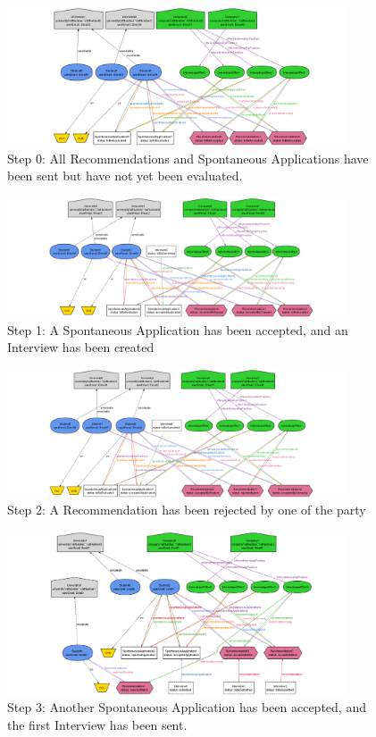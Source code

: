 \begin{figure}[h]
    \centering
    \includegraphics[width=0.9\textwidth]{Alloy/AlloyImage/0.png}
    \caption{Step 0: All Recommendations and Spontaneous Applications have been sent but have not yet been evaluated.}
    \label{fig:ALIMG0}
\end{figure}
\begin{figure}[h]
    \centering
    \includegraphics[width=0.9\textwidth]{Alloy/AlloyImage/1.png}
    \caption{Step 1: A Spontaneous Application has been accepted, and an Interview has been created}
    \label{fig:ALIMG1}
\end{figure}
\begin{figure}[h]
    \centering
    \includegraphics[width=0.9\textwidth]{Alloy/AlloyImage/2.png}
    \caption{Step 2: A Recommendation has been rejected by one of the party}
    \label{fig:ALIMG2}
\end{figure}
\begin{figure}[h]
    \centering
    \includegraphics[width=0.9\textwidth]{Alloy/AlloyImage/3.png}
    \caption{Step 3: Another Spontaneous Application has been accepted, and the first Interview has been sent. }
    \label{fig:ALIMG3}
\end{figure}


